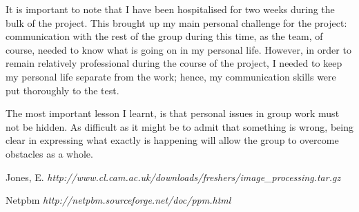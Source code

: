 \documentclass[11pt]{article}
\begin{document}
It is important to note that I have been hospitalised for two weeks during the bulk of the project. This brought up my main personal challenge for the project: communication with the rest of the group during this time, as the team, of course, needed to know what is going on in my personal life. However, in order to remain relatively professional during the course of the project, I needed to keep my personal life separate from the work; hence, my communication skills were put thoroughly to the test.

The most important lesson I learnt, is that personal issues in group work must not be hidden. As difficult as it might be to admit that something is wrong, being clear in expressing what exactly is happening will allow the group to overcome obstacles as a whole.
\medskip

\begin{thebibliography}{1}

Jones, E.
\textit{http://www.cl.cam.ac.uk/downloads/freshers/image\_processing.tar.gz}

Netpbm
\textit{http://netpbm.sourceforge.net/doc/ppm.html}

\end{thebibliography}
\end{document}
